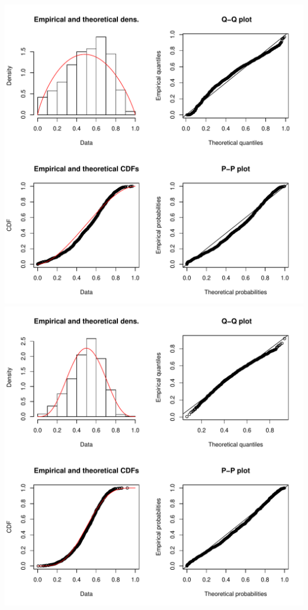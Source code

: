 \documentclass[]{article}
\begin{document}
\includegraphics{2016_w09_files/figure-latex/unnamed-chunk-9-4.pdf}
\includegraphics{2016_w09_files/figure-latex/unnamed-chunk-9-5.pdf}
\end{document}
